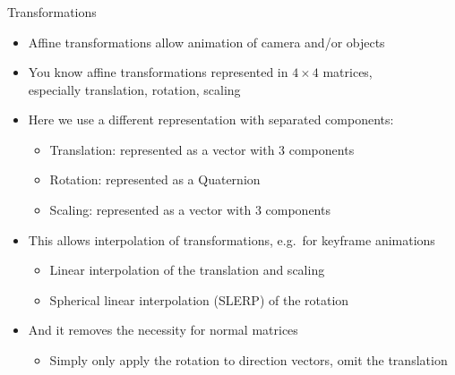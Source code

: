 \documentclass[utf8,stillsansserifmath,fleqn,t]{beamer}
\begin{document}
\begin{frame}
\frametitle{\insertsection}
Transformations
\begin{itemize}
\item Affine transformations allow animation of camera and/or objects
\item You know affine transformations represented in $4\times 4$ matrices,\\
    especially translation, rotation, scaling
\item Here we use a different representation with separated components:
    \begin{itemize}
    \item Translation: represented as a vector with 3 components
    \item Rotation: represented as a Quaternion
    \item Scaling: represented as a vector with 3 components
    \end{itemize}
\item This allows interpolation of transformations, e.g.~for keyframe
animations
    \begin{itemize}
    \item Linear interpolation of the translation and scaling
    \item Spherical linear interpolation (SLERP) of the rotation
    \end{itemize}
\item And it removes the necessity for normal matrices
    \begin{itemize}
    \item Simply only apply the rotation to direction vectors, omit the
    translation 
    \end{itemize}
\end{itemize}
\end{frame}
\end{document}
